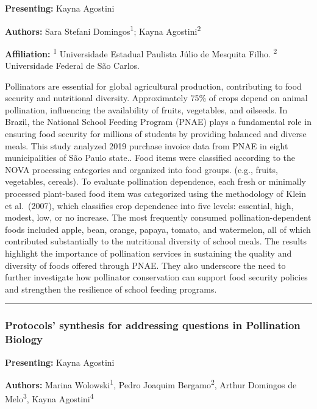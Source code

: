 \documentclass[
  letterpaper,
  DIV=11,
  numbers=noendperiod]{scrartcl}
\begin{document}
\textbf{Presenting:} Kayna Agostini

\textbf{Authors:} Sara Stefani Domingos\textsuperscript{1}; Kayna
Agostini\textsuperscript{2}

\textbf{Affiliation:} \textsuperscript{1} Universidade Estadual Paulista
Júlio de Mesquita Filho. \textsuperscript{2} Universidade Federal de São
Carlos.

Pollinators are essential for global agricultural production,
contributing to food security and nutritional diversity. Approximately
75\% of crops depend on animal pollination, influencing the availability
of fruits, vegetables, and oilseeds. In Brazil, the National School
Feeding Program (PNAE) plays a fundamental role in ensuring food
security for millions of students by providing balanced and diverse
meals. This study analyzed 2019 purchase invoice data from PNAE in eight
municipalities of São Paulo state.. Food items were classified according
to the NOVA processing categories and organized into food groups. (e.g.,
fruits, vegetables, cereals). To evaluate pollination dependence, each
fresh or minimally processed plant-based food item was categorized using
the methodology of Klein et al.~(2007), which classifies crop dependence
into five levels: essential, high, modest, low, or no increase. The most
frequently consumed pollination-dependent foods included apple, bean,
orange, papaya, tomato, and watermelon, all of which contributed
substantially to the nutritional diversity of school meals. The results
highlight the importance of pollination services in sustaining the
quality and diversity of foods offered through PNAE. They also
underscore the need to further investigate how pollinator conservation
can support food security policies and strengthen the resilience of
school feeding programs.

\begin{center}\rule{0.5\linewidth}{0.5pt}\end{center}

\subsubsection{Protocols' synthesis for addressing questions in
Pollination
Biology}\label{protocols-synthesis-for-addressing-questions-in-pollination-biology}

\textbf{Presenting:} Kayna Agostini

\textbf{Authors:} Marina Wolowski\textsuperscript{1}, Pedro Joaquim
Bergamo\textsuperscript{2}, Arthur Domingos de Melo\textsuperscript{3},
Kayna Agostini\textsuperscript{4}
\end{document}
